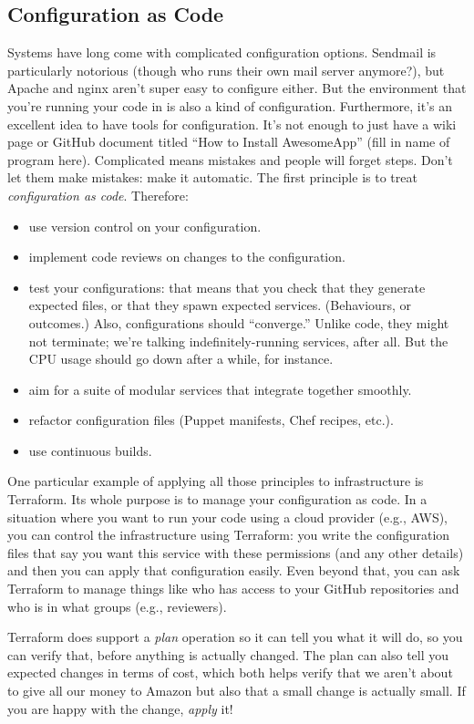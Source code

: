 \subsection*{Configuration as Code}
Systems have long come with complicated configuration options. 
Sendmail is particularly notorious (though who runs their own mail server anymore?), but Apache and nginx aren't super
easy to configure either. But the environment that you're running your code in is also a kind of configuration. Furthermore, it's an excellent idea to have tools for configuration. It's not enough to just have a wiki page or GitHub document titled ``How to Install AwesomeApp'' (fill in name of program here). Complicated means mistakes and people will forget steps. Don't let them make mistakes: make it automatic. The first principle is to treat \emph{configuration as code}. 
Therefore:
\begin{itemize}
\item use version control on your configuration.
\item implement code reviews on changes to the configuration.
\item test your configurations: that means that you check that they
  generate expected files, or that they spawn expected
  services. (Behaviours, or outcomes.) Also, configurations should
  ``converge.'' Unlike code, they might not terminate; we're talking
  indefinitely-running services, after all. But the CPU usage should
  go down after a while, for instance.
\item aim for a suite of modular services that integrate together smoothly.
\item refactor configuration files (Puppet manifests, Chef recipes, etc.).
\item use continuous builds.
\end{itemize}

One particular example of applying all those principles to infrastructure
is Terraform. Its whole purpose is to manage your configuration as code. In a
situation where you want to run your code using a cloud provider (e.g., AWS), 
you can control the infrastructure using Terraform: you write the
configuration files that say you want this service with these permissions
(and any other details) and then you can apply that configuration easily. 
Even beyond that, you can ask Terraform to manage things like who has access
to your GitHub repositories and who is in what groups (e.g., reviewers).

Terraform does support a \emph{plan} operation so it can tell you what it will
do, so you can verify that, before anything is actually changed. The plan can also tell you expected changes in terms of cost, which both helps verify that we aren't about to give all our money to Amazon but also that a small change is actually small. If you are happy with the change, \emph{apply} it! 


